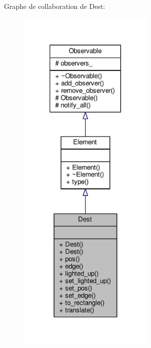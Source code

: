 Graphe de collaboration de Dest\+:
\nopagebreak
\begin{figure}[H]
\begin{center}
\leavevmode
\includegraphics[width=186pt]{d4/d77/classDest__coll__graph}
\end{center}
\end{figure}
